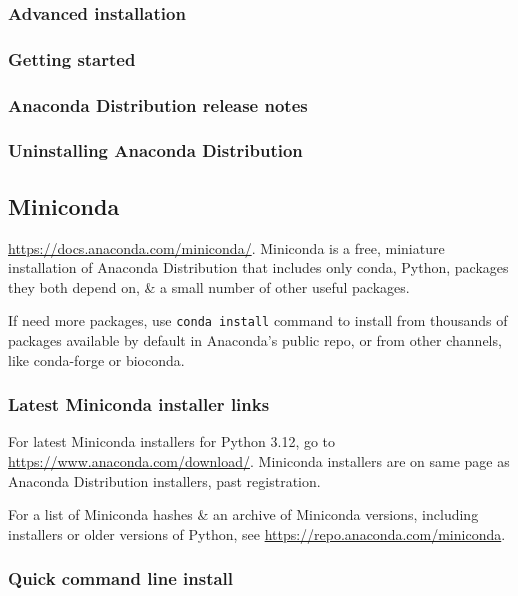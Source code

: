 \documentclass{article}
\begin{document}
\subsubsection{Advanced installation}

\subsubsection{Getting started}

\subsubsection{Anaconda Distribution release notes}

\subsubsection{Uninstalling Anaconda Distribution}

\subsection{Miniconda}
\url{https://docs.anaconda.com/miniconda/}. Miniconda is a free, miniature installation of Anaconda Distribution that includes only conda, Python, packages they both depend on, \& a small number of other useful packages.

If need more packages, use {\tt conda install} command to install from thousands of packages available by default in Anaconda's public repo, or from other channels, like conda-forge or bioconda.

\subsubsection{Latest Miniconda installer links}
For latest Miniconda installers for Python 3.12, go to \url{https://www.anaconda.com/download/}. Miniconda installers are on same page as Anaconda Distribution installers, past registration.

For a list of Miniconda hashes \& an archive of Miniconda versions, including installers or older versions of Python, see \url{https://repo.anaconda.com/miniconda}.

\subsubsection{Quick command line install}

\end{document}
